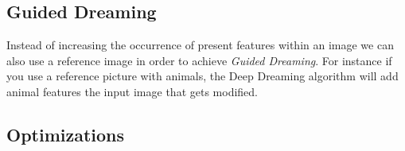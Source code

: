 \subsection{Guided Dreaming}
Instead of increasing the occurrence of present features within an image we can also use a reference image in order to achieve \emph{Guided Dreaming}.
For instance if you use a reference picture with animals, the Deep Dreaming algorithm will add animal features the input image that gets modified.


\subsection{Optimizations}
\label{sec:optimizations}
